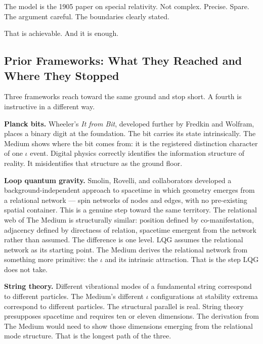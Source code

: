 \documentclass[11pt,letterpaper]{article}
\begin{document}
The model is the 1905 paper on special relativity. Not complex. Precise. Spare. The argument careful. The boundaries clearly stated.

That is achievable. And it is enough.

\subsection{Prior Frameworks: What They Reached and Where They Stopped}
\label{sec:orgc4e30f5}

Three frameworks reach toward the same ground and stop short. A fourth is instructive in a different way.

\textbf{Planck bits.} Wheeler's \emph{It from Bit}, developed further by Fredkin and Wolfram, places a binary digit at the foundation. The bit carries its state intrinsically. The Medium shows where the bit comes from: it is the registered distinction character of one \(\iota\) event. Digital physics correctly identifies the information structure of reality. It misidentifies that structure as the ground floor.

\textbf{Loop quantum gravity.} Smolin, Rovelli, and collaborators developed a background-independent approach to spacetime in which geometry emerges from a relational network --- spin networks of nodes and edges, with no pre-existing spatial container. This is a genuine step toward the same territory. The relational web of The Medium is structurally similar: position defined by co-manifestation, adjacency defined by directness of relation, spacetime emergent from the network rather than assumed. The difference is one level. LQG assumes the relational network as its starting point. The Medium derives the relational network from something more primitive: the \(\iota\) and its intrinsic attraction. That is the step LQG does not take.

\textbf{String theory.} Different vibrational modes of a fundamental string correspond to different particles. The Medium's different \(\iota\) configurations at stability extrema correspond to different particles. The structural parallel is real. String theory presupposes spacetime and requires ten or eleven dimensions. The derivation from The Medium would need to show those dimensions emerging from the relational mode structure. That is the longest path of the three.
\end{document}
